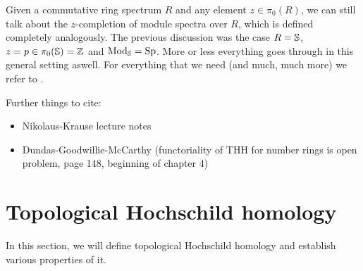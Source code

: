 Given a commutative ring spectrum $R$ and any element $z\in\pi_0(R)$, we can still talk about the $z$-completion of module spectra over $R$, which is defined completely analogously. The previous discussion was the case $R=\S$, $z=p\in\pi_0(\S)=\Z$ and $\Mod_\S=\Sp$. More or less everything goes through in this general setting aswell. For everything that we need (and much, much more) we refer to \cite[Section~7.3]{SAG}.

Further things to cite:
\begin{itemize}
    \item Nikolaus-Krause lecture notes \cite{krausenikolausTCnotes} 
    \item Dundas-Goodwillie-McCarthy (functoriality of THH for number rings is open problem, page 148, beginning of chapter 4)
    \cite[148]{DundasGoodwillieMccarthyLocalstructure}
\end{itemize}




\section{Topological Hochschild homology}
In this section, we will define topological Hochschild homology and establish various properties of it.

